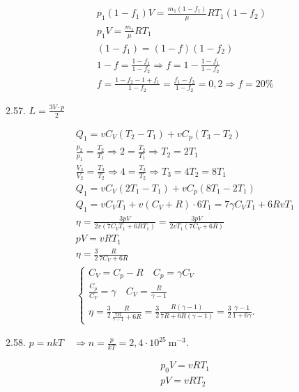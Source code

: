 \documentclass[10pt]{article}
\begin{document}
$$
\begin{aligned}
& p_{1}\left(1-f_{1}\right) V=\frac{m_{1}\left(1-f_{1}\right)}{\mu} R T_{1}\left(1-f_{2}\right) \\
& p_{1} V=\frac{m_{1}}{\mu} R T_{1} \\
& \left(1-f_{1}\right)=(1-f)\left(1-f_{2}\right) \\
& 1-f=\frac{1-f_{1}}{1-f_{2}} \Rightarrow f=1-\frac{1-f_{1}}{1-f_{2}} \\
& f=\frac{1-f_{2}-1+f_{1}}{1-f_{2}}=\frac{f_{1}-f_{2}}{1-f_{2}}=0,2 \Rightarrow f=20 \%
\end{aligned}
$$

2.57. $L=\frac{3 V \cdot p}{2}$

$$
\begin{aligned}
& Q_{1}=v C_{V}\left(T_{2}-T_{1}\right)+v C_{p}\left(T_{3}-T_{2}\right) \\
& \frac{p_{2}}{p_{1}}=\frac{T_{2}}{T_{1}} \Rightarrow 2=\frac{T_{2}}{T_{1}} \Rightarrow T_{2}=2 T_{1} \\
& \frac{V_{3}}{V_{2}}=\frac{T_{3}}{T_{2}} \Rightarrow 4=\frac{T_{3}}{T_{2}} \Rightarrow T_{3}=4 T_{2}=8 T_{1} \\
& Q_{1}=v C_{V}\left(2 T_{1}-T_{1}\right)+v C_{p}\left(8 T_{1}-2 T_{1}\right) \\
& Q_{1}=v C_{V} T_{1}+v\left(C_{V}+R\right) \cdot 6 T_{1}=7 \gamma C_{V} T_{1}+6 R v T_{1} \\
& \eta=\frac{3 p V}{2 v\left(7 C_{V} T_{1}+6 R T_{1}\right)}=\frac{3 p V}{2 v T_{1}\left(7 C_{V}+6 R\right)} \\
& p V=v R T_{1} \\
& \eta=\frac{3}{2} \frac{R}{7 C_{V}+6 R} \\
& \left\{\begin{array}{l}
C_{V}=C_{p}-R \quad C_{p}=\gamma C_{V} \\
\frac{C_{p}}{C_{V}}=\gamma \quad C_{V}=\frac{R}{\gamma-1} \\
\eta=\frac{3}{2} \frac{R}{\frac{7 R}{\gamma-1}+6 R}=\frac{3}{2} \frac{R(\gamma-1)}{7 R+6 R(\gamma-1)}=\frac{3}{2} \frac{\gamma-1}{1+6 \gamma} .
\end{array}\right.
\end{aligned}
$$

2.58. $p=n k T \quad \Rightarrow n=\frac{p}{k T}=2,4 \cdot 10^{25} \mathrm{~m}^{-3}$.

$$
\begin{aligned}
& p_{0} V=v R T_{1} \\
& p V=v R T_{2}
\end{aligned}
$$
\end{document}
